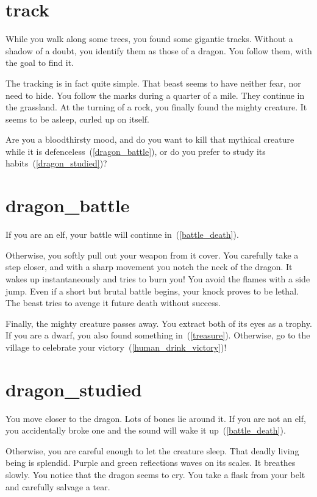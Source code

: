 \section{track}

While you walk along some trees, you found some gigantic tracks. Without a
shadow of a doubt, you identify them as those of a dragon. You follow them, with
the goal to find it.

The tracking is in fact quite simple. That beast seems to have neither fear, nor
need to hide. You follow the marks during a quarter of a mile. They continue in
the grassland. At the turning of a rock, you finally found the mighty creature.
It seems to be asleep, curled up on itself.

Are you a bloodthirsty mood, and do you want to kill that mythical creature while it
is defenceless~(\ref{dragon_battle}), or do you prefer to study its
habits~(\ref{dragon_studied})?

\section{dragon_battle}

If you are an elf, your battle will continue in~(\ref{battle_death}).

\medbreak

Otherwise, you softly pull out your weapon from it cover. You carefully take a
step closer, and with a sharp movement you notch the neck of the dragon. It wakes
up instantaneously and tries to burn you! You avoid the flames with a side jump.
Even if a short but brutal battle begins, your knock proves to be lethal. The
beast tries to avenge it future death without success.

Finally, the mighty creature passes away. You extract both of its eyes as a
trophy. If you are a dwarf, you also found something in~(\ref{treasure}).
Otherwise, go to the village to celebrate your
victory~(\ref{human_drink_victory})!

\section{dragon_studied}

You move closer to the dragon. Lots of bones lie around it. If you are not an
elf, you accidentally broke one and the sound will wake it
up~(\ref{battle_death}).

\medbreak

Otherwise, you are careful enough to let the creature sleep. That deadly living
being is splendid. Purple and green reflections waves on its scales. It breathes
slowly. You notice that the dragon seems to cry. You take a flask from your belt
and carefully salvage a tear.

